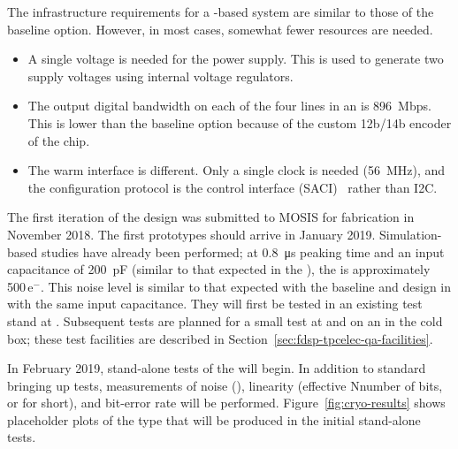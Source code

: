 
The infrastructure requirements for a  -based system are similar to those of the baseline option. However, in most cases, somewhat fewer resources are needed.
\begin{itemize}
\item{A single voltage is needed for the power supply. This is used to generate two supply voltages using internal voltage regulators.}
\item{The output digital bandwidth on each of the four lines in an  is \SI{896}{Mbps}. This is lower than the baseline option because of the custom 12b/14b encoder of the  chip. }
\item{The warm interface is different. Only a single clock is needed (\SI{56}{MHz}), and the configuration protocol is the   control interface (SACI)~\cite{SACI} rather than I2C.} 
\end{itemize}

The first iteration of the   design was submitted to MOSIS  for fabrication in November 2018.  The first prototypes should arrive in January 2019. Simulation-based studies have already been performed; at \SI{0.8}{\micro\second} peaking time and an input capacitance of \SI{200}{pF} (similar to that expected in the  ), the  is approximately \num{500}\,e$^-$.  This noise level is similar to that expected with the baseline  and   design in  with the same input capacitance.  They will first be tested in an existing test stand at .  Subsequent tests are planned for a small test  at  and on an  in the  cold box; these test facilities are described in Section~\ref{sec:fdsp-tpcelec-qa-facilities}.

In February 2019, stand-alone tests of the   will begin. In addition to standard bringing up tests, measurements of noise (), linearity (effective Nnumber of bits, or  for short), and bit-error rate will be performed. Figure~\ref{fig:cryo-results} shows placeholder plots of the type that will be produced in the initial stand-alone tests.

